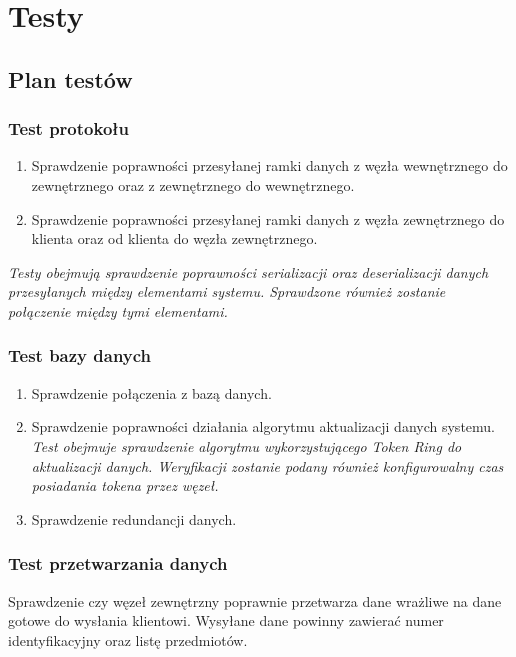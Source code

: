 \chapter{Testy}

\section{Plan testów}


\subsection[Test protokołu]{Test protokołu}
\begin{enumerate}
\item Sprawdzenie poprawności przesyłanej ramki danych z węzła wewnętrznego do zewnętrznego oraz z zewnętrznego do wewnętrznego.
\item Sprawdzenie poprawności przesyłanej ramki danych z węzła zewnętrznego do klienta oraz od klienta do węzła zewnętrznego.
\end{enumerate}
	
\textit{Testy obejmują sprawdzenie poprawności serializacji oraz deserializacji danych przesyłanych między elementami systemu. Sprawdzone również zostanie połączenie między tymi elementami.}

\subsection[Test bazy danych]{Test bazy danych}
\begin{enumerate}
\item Sprawdzenie połączenia z bazą danych.
\item Sprawdzenie poprawności działania algorytmu aktualizacji danych systemu. \\
\textit{Test obejmuje sprawdzenie algorytmu wykorzystującego Token Ring do aktualizacji danych. Weryfikacji zostanie podany również konfigurowalny czas posiadania tokena przez węzeł.}
\item Sprawdzenie redundancji danych.

\end{enumerate}

\subsection[Test przetwarzania danych]{Test przetwarzania danych}
Sprawdzenie czy węzeł zewnętrzny poprawnie przetwarza dane wrażliwe na dane gotowe do wysłania klientowi. Wysyłane dane powinny zawierać numer identyfikacyjny oraz listę przedmiotów.


